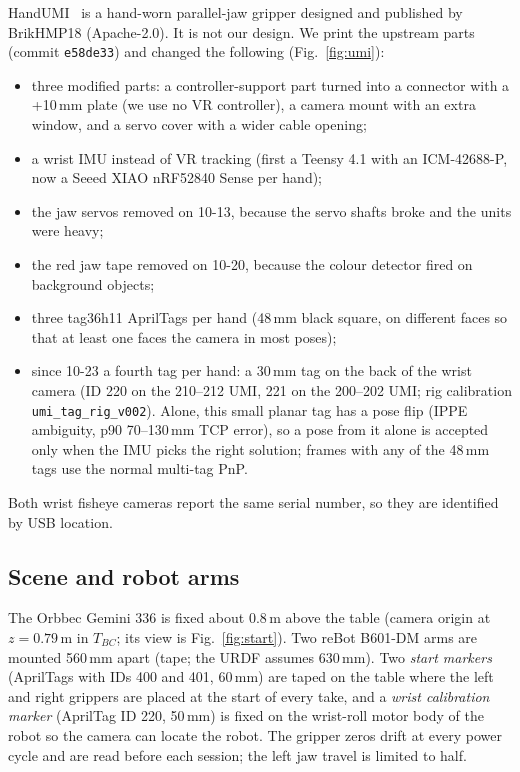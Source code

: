 \documentclass[conference,10pt]{IEEEtran}
\newcommand{\mm}{\,mm\xspace}
\begin{document}
HandUMI~\cite{handumi,meza2026handumi} is a hand-worn parallel-jaw gripper designed and published by BrikHMP18
(Apache-2.0). It is not our design. We print the upstream parts (commit \texttt{e58de33}) and changed the following
(Fig.~\ref{fig:umi}):
\begin{itemize}
\item three modified parts: a controller-support part turned into a connector with a +10\mm plate (we use no VR
  controller), a camera mount with an extra window, and a servo cover with a wider cable opening;
\item a wrist IMU instead of VR tracking (first a Teensy 4.1 with an ICM-42688-P, now a Seeed XIAO nRF52840 Sense per hand);
\item the jaw servos removed on 10-13, because the servo shafts broke and the units were heavy;
\item the red jaw tape removed on 10-20, because the colour detector fired on background objects;
\item three tag36h11 AprilTags per hand (48\mm black square, on different faces so that at least one faces the camera in
  most poses);
\item since 10-23 a fourth tag per hand: a 30\mm tag on the back of the wrist camera (ID 220 on the 210--212 UMI, 221 on
  the 200--202 UMI; rig calibration \texttt{umi\_tag\_rig\_v002}). Alone, this small planar tag has a pose flip (IPPE
  ambiguity, p90 70--130\mm TCP error), so a pose from it alone is accepted only when the IMU picks the right solution;
  frames with any of the 48\mm tags use the normal multi-tag PnP.
\end{itemize}
Both wrist fisheye cameras report the same serial number, so they are identified by USB location.

\subsection{Scene and robot arms}


The Orbbec Gemini 336 is fixed about 0.8\,m above the table (camera origin at $z=0.79$\,m in $T_{BC}$; its view is Fig.~\ref{fig:start}). Two reBot B601-DM arms are mounted
560\mm apart (tape; the URDF assumes 630\mm). Two \emph{start markers} (AprilTags with IDs 400 and 401, 60\mm) are taped on the table where the left and right
grippers are placed at the start of every take, and a \emph{wrist calibration marker} (AprilTag ID 220, 50\mm) is fixed
on the wrist-roll motor body of the robot so the camera can locate the robot. The gripper zeros drift at every power cycle and are
read before each session; the left jaw travel is limited to half.
\end{document}
